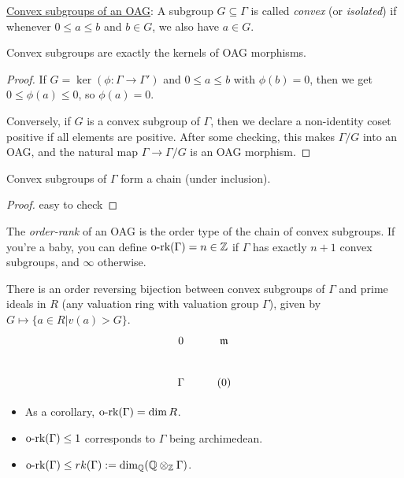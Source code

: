  \underline{Convex subgroups of an OAG}: A subgroup $G\subseteq \Gamma$ is called
 \emph{convex} (or \emph{isolated}) if whenever $0\le a\le b$ and $b\in G$, we also have
 $a\in G$.
 \begin{theorem}
   Convex subgroups are exactly the kernels of OAG morphisms.
 \end{theorem}
 \begin{proof}
   If $G=\ker (\phi:\Gamma\to \Gamma')$ and $0\le a\le b$ with $\phi(b)=0$, then we get
   $0\le \phi(a)\le 0$, so $\phi(a)=0$.

   Conversely, if $G$ is a convex subgroup of $\Gamma$, then we declare a non-identity
   coset positive if all elements are positive. After some checking, this makes
   $\Gamma/G$ into an OAG, and the natural map $\Gamma\to \Gamma/G$ is an OAG morphism.
   \anton{}
 \end{proof}
 \begin{lemma}
   Convex subgroups of $\Gamma$ form a chain (under inclusion).
 \end{lemma}
 \begin{proof}
   easy to check \anton{}
 \end{proof}
 \begin{definition}
   The \emph{order-rank} of an OAG is the order type of the chain of convex subgroups. If
   you're a baby, you can define $\textrm{o-rk}(\Gamma)=n\in \mathbb{Z}$ if $\Gamma$ has exactly
   $n+1$ convex subgroups, and $\infty$ otherwise.
 \end{definition}
 There is an order reversing bijection between convex subgroups of $\Gamma$ and prime
 ideals in $R$ (any valuation ring with valuation group $\Gamma$), given by $G\mapsto
 \{a\in R|v(a)>G\}$.
 \[\xymatrix{
 0 & \m\\
 \Gamma & (0)
 }\]
 \begin{itemize}
   \item As a corollary, $\textrm{o-rk}(\Gamma)=\dim R$.
   \item $\textrm{o-rk}(\Gamma)\le 1$ corresponds to $\Gamma$ being archimedean.
   \item $\textrm{o-rk}(\Gamma)\le rk(\Gamma) := \dim_{\mathbb{Q}}(\mathbb{Q}\otimes_{\mathbb{Z}} \Gamma)$.
 \end{itemize}

